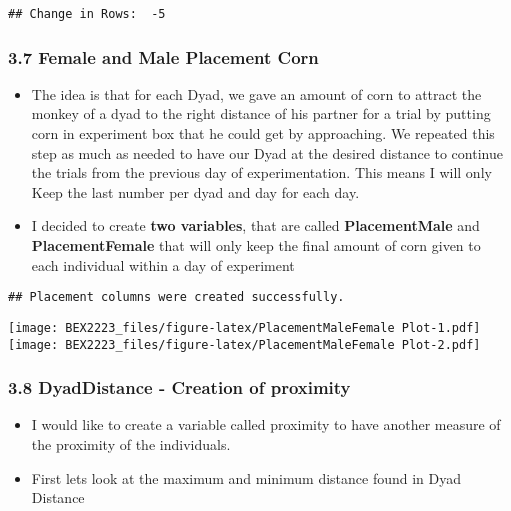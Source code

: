 \documentclass[
]{article}
\providecommand{\tightlist}{%
  \setlength{\itemsep}{0pt}\setlength{\parskip}{0pt}}
\begin{document}
\begin{verbatim}
## Change in Rows:  -5
\end{verbatim}

\hypertarget{female-and-male-placement-corn}{%
\subsubsection{3.7 Female and Male Placement
Corn}\label{female-and-male-placement-corn}}

\begin{itemize}
\tightlist
\item
  The idea is that for each Dyad, we gave an amount of corn to attract
  the monkey of a dyad to the right distance of his partner for a trial
  by putting corn in experiment box that he could get by approaching. We
  repeated this step as much as needed to have our Dyad at the desired
  distance to continue the trials from the previous day of
  experimentation. This means I will only Keep the last number per dyad
  and day for each day.
\item
  I decided to create \textbf{two variables}, that are called
  \textbf{PlacementMale} and \textbf{PlacementFemale} that will only
  keep the final amount of corn given to each individual within a day of
  experiment
\end{itemize}

\begin{verbatim}
## Placement columns were created successfully.
\end{verbatim}

\texttt{[image: BEX2223\_files/figure-latex/PlacementMaleFemale Plot-1.pdf]}
\texttt{[image: BEX2223\_files/figure-latex/PlacementMaleFemale Plot-2.pdf]}

\hypertarget{dyaddistance---creation-of-proximity}{%
\subsubsection{3.8 DyadDistance - Creation of
proximity}\label{dyaddistance---creation-of-proximity}}

\begin{itemize}
\tightlist
\item
  I would like to create a variable called proximity to have another
  measure of the proximity of the individuals.
\item
  First lets look at the maximum and minimum distance found in Dyad
  Distance
\end{itemize}
\end{document}
